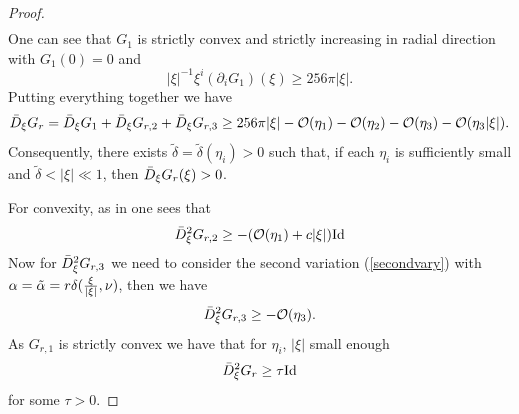 \documentclass[12pt,a4paper]{amsart}
\theoremstyle{plain}
\theoremstyle{definition}
\begin{document}
\begin{proof}
\begin{equation}
\begin{split}
   \end{split}
\end{equation}
 One can see that $G_1$ is strictly convex and   strictly  increasing in radial direction with $G_1(0)=0$ and   
\[
|\xi|^{-1}  \xi^i (\partial_i G_1)(\xi )\geq 256 \pi |\xi|.
\]
 Putting everything together we have 
\begin{equation}\label{DGexp}
    \Bar{D}_\xi G_r = \Bar{D}_\xi G_1 + \Bar{D}_\xi G_{r,2}+\Bar{D}_\xi G_{r,3} \geq  256 \pi |\xi| -\mathcal{O}(\eta_1) -\mathcal{O}(\eta_2) -\mathcal{O}(\eta_3) - \mathcal{O}(\eta_3|\xi|).
\end{equation}
Consequently, there exists  \(\tilde\delta = \tilde\delta(\eta_i) > 0\) such that, if each \(\eta_i\) is sufficiently small and 
$\tilde\delta < |\xi| \ll 1$, then 
$\Bar{D}_\xi G_r(\xi) > 0$.

For convexity, as in \cite[Lemma 24]{eichko} one sees that 
\begin{equation}
    \Bar{D}^2_\xi G_{r,2} \geq -( \mathcal{O}(\eta_1 ) +c |\xi|) \text{Id}
\end{equation}
Now for $\Bar{D}^2_\xi G_{r,3}$ we need to consider the second variation (\ref{secondvary}) with $\alpha= \Tilde{\alpha}= r \delta( \frac{\xi}{|\xi|}, \nu )$,  then we have
\begin{equation}
    \Bar{D}^2_\xi G_{r,3} \geq - \mathcal{O}(\eta_3 ). 
\end{equation}
 As $G_{r,1}$ is strictly convex we have that for $ \eta_i$, $|\xi|$  small enough 
\begin{equation}
   \Bar{D}^2_\xi G_{r} \geq \tau \text{Id} 
\end{equation}
for some $\tau>0$.
\end{proof}
\end{document}

